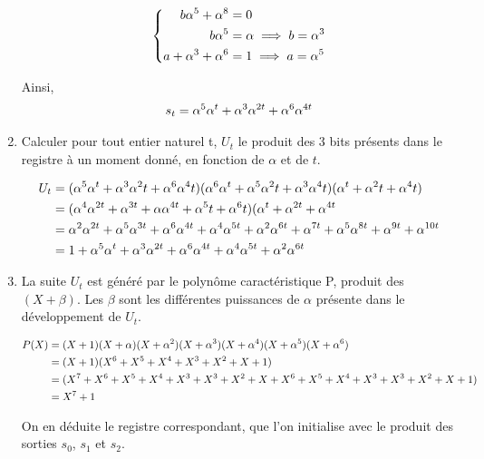 \documentclass[a4paper,10pt]{article}
\begin{document}
\begin{enumerate}
	\[
	\left\{
	\begin{aligned}	
	b \alpha^5 +\alpha^8 &= 0  \notag \\
	b \alpha^5 &= \alpha \implies b= \alpha^3 \notag \\
	a+ \alpha^3 +\alpha^6 &=1 \implies a = \alpha^5 \notag 
		\end{aligned}	
	\right.\]		
	
Ainsi, 
\begin{align}
s_t= \alpha^5 \alpha^t + \alpha^3 \alpha^{2t} + \alpha^6 \alpha^{4t} \notag
\end{align}
\item
Calculer pour tout entier naturel t, $U_t$ le produit des 3 bits présents dans le registre à un moment donné, en fonction de $\alpha$ et de $t$.

\begin{align}
	U_t &= (\alpha^5 \alpha^t + \alpha^3 \alpha^2t + \alpha^6 \alpha^4t)(\alpha^6 \alpha^t + \alpha^5 \alpha^2t + \alpha^3 \alpha^4t)(\alpha^t + \alpha^2t + \alpha^4t) \notag \\
	&= (\alpha^4 \alpha^{2t} + \alpha^{3t} + \alpha \alpha^{4t} + \alpha^5t + \alpha^6t)(\alpha^t + \alpha^{2t}+ \alpha^{4t} \notag \\
	&= \alpha^2\alpha^{2t}+\alpha^5 \alpha^{3t} + \alpha^6 \alpha^{4t} + \alpha^4 \alpha^{5t} + \alpha^2 \alpha^{6t} + \alpha^{7t} + \alpha^5 \alpha^{8t} + \alpha^{9t} + \alpha^{10t} \notag \\
	&=1+ \alpha^5\alpha^t+\alpha^3\alpha^{2t}+\alpha^6\alpha^{4t}+\alpha^4\alpha^{5t}+\alpha^2\alpha^{6t} \notag
\end{align}
\item
La suite $U_t$ est généré par le polynôme caractéristique P, produit des $(X+ \beta)$. Les $\beta$ sont les différentes puissances de $\alpha$ présente dans le développement de $U_t$.

\begin{align}
	P(X) &= (X+1)(X+\alpha)(X+\alpha^2)(X+\alpha^3)(X+\alpha^4)(X+\alpha^5)(X+\alpha^6) \notag \\
	&=(X+1)(X^6+X^5+X^4+X^3+X^2+X+1) \notag \\
	&=(X^7+X^6+X^5+X^4+X^3+X^3+X^2+X+X^6+X^5+X^4+X^3+X^3+X^2+X+1)\notag \\
	&= X^7+1 \notag
\end{align}

On en déduite le registre correspondant, que l'on initialise avec le produit des sorties $s_0$, $s_1$ et $s_2$.


\end{enumerate}
\end{document}
